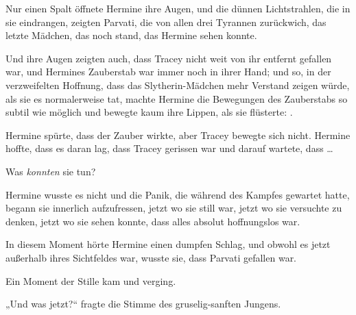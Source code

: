Nur einen Spalt öffnete Hermine ihre Augen, und die dünnen Lichtstrahlen, die in sie eindrangen, zeigten Parvati, die von allen drei Tyrannen zurückwich, das letzte Mädchen, das noch stand, das Hermine sehen konnte.

Und ihre Augen zeigten auch, dass Tracey nicht weit von ihr entfernt gefallen war, und Hermines Zauberstab war immer noch in ihrer Hand; und so, in der verzweifelten Hoffnung, dass das Slytherin-Mädchen mehr Verstand zeigen würde, als sie es normalerweise tat, machte Hermine die Bewegungen des Zauberstabs so subtil wie möglich und bewegte kaum ihre Lippen, als sie flüsterte: .

Hermine spürte, dass der Zauber wirkte, aber Tracey bewegte sich nicht. Hermine hoffte, dass es daran lag, dass Tracey gerissen war und darauf wartete, dass …

Was \emph{konnten} sie tun?

Hermine wusste es nicht und die Panik, die während des Kampfes gewartet hatte, begann sie innerlich aufzufressen, jetzt wo sie still war, jetzt wo sie versuchte zu denken, jetzt wo sie sehen konnte, dass alles absolut hoffnungslos war.

In diesem Moment hörte Hermine einen dumpfen Schlag, und obwohl es jetzt außerhalb ihres Sichtfeldes war, wusste sie, dass Parvati gefallen war.

Ein Moment der Stille kam und verging.

„Und was jetzt?“ fragte die Stimme des gruselig-sanften Jungens.

